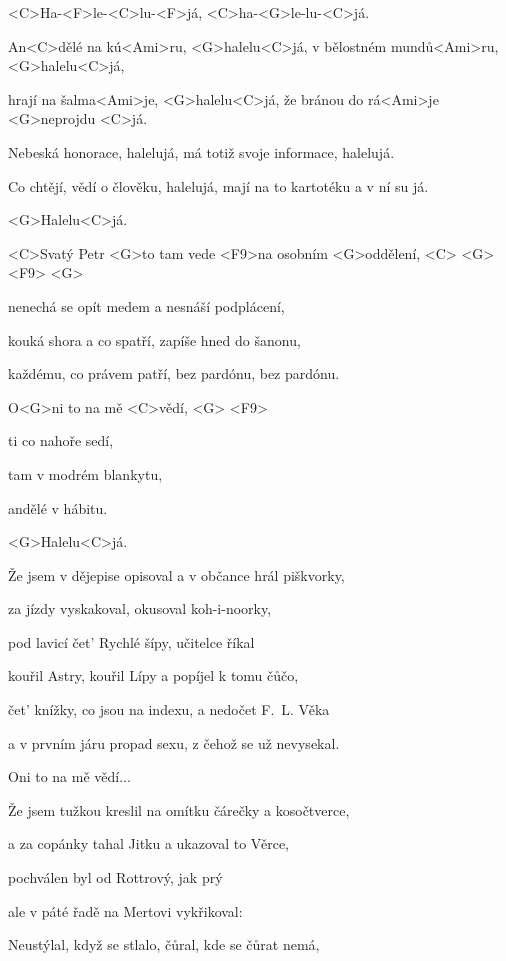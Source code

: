 

<C>Ha-<F>le-<C>lu-<F>já, <C>ha-<G>le-lu-<C>já.

\zr
An<C>dělé na kú<Ami>ru, <G>halelu<C>já, v bělostném mundů<Ami>ru, <G>halelu<C>já,

hrají na šalma<Ami>je, <G>halelu<C>já, že bránou do rá<Ami>je <G>neprojdu <C>já.

Nebeská honorace, halelujá, má totiž svoje informace, halelujá.

Co chtějí, vědí o člověku, halelujá, mají na to kartotéku a v ní su já.

<G>Halelu<C>já.
\kr

\zs
<C>Svatý Petr <G>to tam vede <F9>na osobním <G>oddělení, <C> <G> <F9> <G>

nenechá se opít medem a nesnáší podplácení,

kouká shora a co spatří, zapíše hned do šanonu,

každému, co právem patří, bez pardónu, bez pardónu.

O<G>ni to na mě <C>vědí, <G> <F9>

ti co nahoře sedí,

tam v modrém blankytu,

andělé v hábitu.

<G>Halelu<C>já.
\ks

\zr\kr

\zs
Že jsem v dějepise opisoval a v občance hrál piškvorky,

za jízdy vyskakoval, okusoval koh-i-noorky,

pod lavicí čet' Rychlé šípy, učitelce říkal 

kouřil Astry, kouřil Lípy a popíjel k tomu čůčo,

čet' knížky, co jsou na indexu, a nedočet F.~L. Věka

a v prvním járu propad sexu, z čehož se už nevysekal.

Oni to na mě vědí...
\ks

\zr\kr

\zs
Že jsem tužkou kreslil na omítku čárečky a kosočtverce,

a za copánky tahal Jitku a ukazoval to Věrce,

pochválen byl od Rottrový, jak prý 

ale v páté řadě na Mertovi vykřikoval: 

Neustýlal, když se stlalo, čůral, kde se čůrat nemá,

